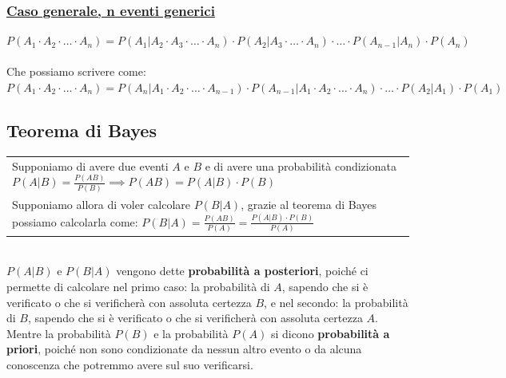 \documentclass{article}
\begin{document}
\subsubsection{\underline{Caso generale, n eventi generici}}
$P(A_1 \cdot A_2 \cdot \dots \cdot A_n) = P(A_1|A_2 \cdot A_3 \cdot \dots \cdot A_n) \cdot P(A_2|A_3 \cdot \dots \cdot A_n) \cdot \dots \cdot P(A_{n-1}| A_n) \cdot P(A_n)$ \\ \\
Che possiamo scrivere come: \\
$P(A_1 \cdot A_2 \cdot \dots \cdot A_n) = P(A_n|A_1 \cdot A_2 \cdot \dots \cdot A_{n-1}) \cdot P(A_{n-1}|A_1 \cdot A_2 \cdot \dots \cdot A_n) \cdot \dots \cdot P(A_2| A_1) \cdot P(A_1)$

\subsection{Teorema di Bayes}
\begin{tabular}{|p{13cm}}
Supponiamo di avere due eventi $A$ e $B$ e di avere una probabilità condizionata $P(A|B) = \frac{P(AB)}{P(B)} \implies P(AB) = P(A|B) \cdot P(B)$ \\
Supponiamo allora di voler calcolare $P(B|A)$, grazie al teorema di Bayes possiamo calcolarla come: $P(B|A) = \frac{P(AB)}{P(A)} = \frac{P(A|B) \cdot P(B)}{P(A)}$ 
\end{tabular} \\
$P(A|B)$ e $P(B|A)$ vengono dette \textbf{probabilità a posteriori}, poiché ci permette di calcolare nel primo caso: la probabilità di $A$, sapendo che si è verificato o che si verificherà con assoluta certezza $B$, e nel secondo: la probabilità di $B$, sapendo che si è verificato o che si verificherà con assoluta certezza $A$. \\
Mentre la probabilità $P(B)$ e la probabilità $P(A)$ si dicono \textbf{probabilità a priori}, poiché non sono condizionate da nessun altro evento o da alcuna conoscenza che potremmo avere sul suo verificarsi. 
\end{document}
